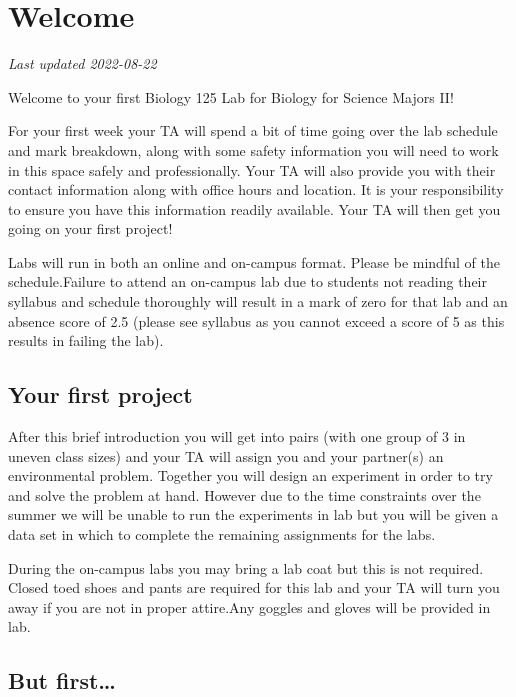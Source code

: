 \documentclass[
]{book}
\begin{document}
\hypertarget{welcome-1}{%
\chapter*{Welcome}\label{welcome-1}}

\emph{Last updated 2022-08-22}

Welcome to your first Biology 125 Lab for Biology for Science Majors II!

For your first week your TA will spend a bit of time going over the lab schedule and mark breakdown, along with some safety information you will need to work in this space safely and professionally. Your TA will also provide you with their contact information along with office hours and location. It is your responsibility to ensure you have this information readily available. Your TA will then get you going on your first project!

Labs will run in both an online and on-campus format. Please be mindful of the schedule.Failure to attend an on-campus lab due to students not reading their syllabus and schedule thoroughly will result in a mark of zero for that lab and an absence score of 2.5 (please see syllabus as you cannot exceed a score of 5 as this results in failing the lab).

\hypertarget{your-first-project}{%
\section*{Your first project}\label{your-first-project}}

After this brief introduction you will get into pairs (with one group of 3 in uneven class sizes) and your TA will assign you and your partner(s) an environmental problem. Together you will design an experiment in order to try and solve the problem at hand. However due to the time constraints over the summer we will be unable to run the experiments in lab but you will be given a data set in which to complete the remaining assignments for the labs.

During the on-campus labs you may bring a lab coat but this is not required. Closed toed shoes and pants are required for this lab and your TA will turn you away if you are not in proper attire.Any goggles and gloves will be provided in lab.

\hypertarget{but-first}{%
\section*{But first\ldots{}}\label{but-first}}
\end{document}
